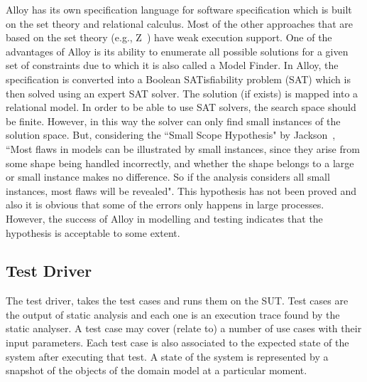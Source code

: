 Alloy has its own specification language for software specification which is built on the set theory and relational calculus. Most of the other approaches that are based on the set theory (e.g., Z~\cite{Spivey1992}) have weak execution support. One of the advantages of Alloy is its ability to enumerate all possible solutions for a given set of constraints due to which it is also called a Model Finder. In Alloy, the specification is converted into a Boolean SATisfiability problem (SAT) which is then solved using an expert SAT solver. The solution (if exists) is mapped into a relational model. In order to be able to use SAT solvers, the search space should be finite. However, in this way the solver can only find small instances of the solution space. But, considering the ``Small Scope Hypothesis" by Jackson~\cite{Jackson2012}, ``Most flaws in models can be illustrated by small instances, since they arise from some shape being handled incorrectly, and whether the shape belongs to a large or small instance makes no difference. So if the analysis considers all small instances, most flaws will be revealed". This hypothesis has not been proved and also it is obvious that some of the errors only happens in large processes. However, the success of Alloy in modelling and testing indicates that the hypothesis is acceptable to some extent.


\subsection{Test Driver}
\label{sec:framework-overview-test-driver}
The test driver, takes the test cases and runs them on the SUT. Test cases are the output of static analysis and each one is an execution trace found by the static analyser. A test case may cover (relate to) a number of use cases with their input parameters. Each test case is also associated to the expected state of the system after executing that test. A state of the system is represented by a snapshot of the objects of the domain model at a particular moment. 

